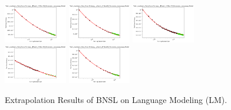 \documentclass{article} %
\begin{document}
\begin{figure}
    \centering


\includegraphics[width=0.245\textwidth]{figures/scaling_laws_benchmark_dataset_plots/validation_loss___1.07e+09.png}
\includegraphics[width=0.245\textwidth]{figures/scaling_laws_benchmark_dataset_plots/validation_loss___1.34e+08.png}
\includegraphics[width=0.245\textwidth]{figures/scaling_laws_benchmark_dataset_plots/validation_loss___1.68e+07.png}
\includegraphics[width=0.245\textwidth]{figures/scaling_laws_benchmark_dataset_plots/validation_loss___2.62e+08.png}
\includegraphics[width=0.245\textwidth]{figures/scaling_laws_benchmark_dataset_plots/validation_loss___4.53e+08.png}

    \caption{
    Extrapolation Results of BNSL on Language Modeling (LM).
    }
    \label{fig:scaling_laws_benchmark_dataset__language_modeling}
\end{figure}
\end{document}
